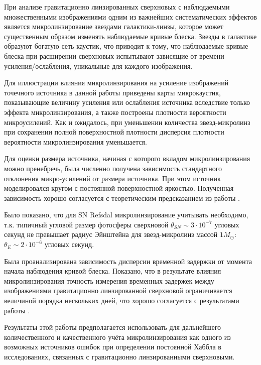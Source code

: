 При анализе гравитационно линзированных сверхновых с наблюдаемыми множественными изображениями одним из важнейших систематических эффектов является микролинзирование звездами галактики-линзы, которое может существенным образом изменять наблюдаемые кривые блеска. Звезды в галактике образуют богатую сеть каустик, что приводит к тому, что наблюдаемые кривые блеска при расширении сверхновых испытывают зависящие от времени усиления/ослабления, уникальные для каждого изображения.

Для иллюстрации влияния микролинзирования на усиление изображений точечного источника в данной работы приведены карты микрокаустик, показывающие величину усиления или ослабления источника вследствие только эффекта микролинзирования, а также построены плотности вероятности микроусилений. Как и ожидалось, при уменьшении количества звезд-микролинз при сохранении полной поверхностной плотности дисперсия плотности вероятности микролинзирования уменьшается.

Для оценки размера источника, начиная с которого вкладом микролинзирования можно пренебречь, была численно получена зависимость стандартного отклонения микро-усилений от размера источника. При этом источник моделировался кругом с постоянной поверхностной яркостью. Полученная зависимость хорошо согласуется с теоретическим предсказанием из работы \cite{refsdalstabell1991}. 

Было показано, что для SN Refsdal микролинзирование учитывать необходимо, т.к. типичный угловой размер фотосферы сверхновой $\theta_{SN} \sim 3 \cdot 10^{-7}$ угловых секунд не превышает радиус Эйнштейна для звезд-микролинз массой $1 M_{\odot}$: $\theta_E \sim 2 \cdot 10^{-6}$ угловых секунд.

Была проанализирована зависимость дисперсии временной задержки от момента начала наблюдения кривой блеска. Показано, что в результате влияния микролинзирования точность измерения временных задержек между изображениями гравитационно линзированной сверхновой ограничивается величиной порядка нескольких дней, что хорошо согласуется с результатами работы \cite{doblerkeeton2006}.

Результаты этой работы предполагается использовать для дальнейшего количественного и качественного учёта микролинзирования как одного из возможных источников ошибок при определении постоянной Хаббла в исследованиях, связанных с гравитационно линзированными сверхновыми.
